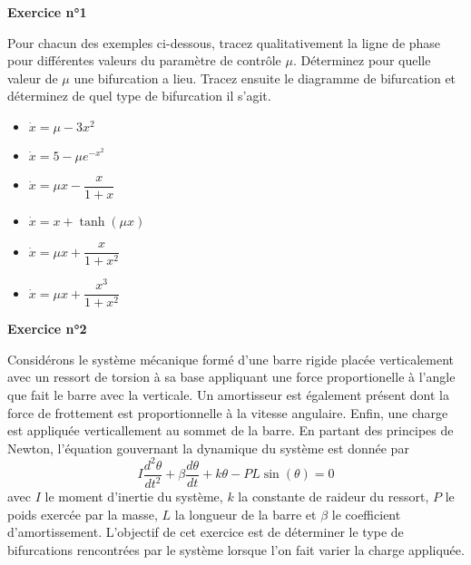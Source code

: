 \documentclass[12pt]{exam}
\begin{document}
\begin{questions}

  \question[10] \textbf{Exercice n°1}
  \noaddpoints

  Pour chacun des exemples ci-dessous, tracez qualitativement la ligne de phase pour différentes valeurs du paramètre de contrôle $\mu$.
  Déterminez pour quelle valeur de $\mu$ une bifurcation a lieu.
  Tracez ensuite le diagramme de bifurcation et déterminez de quel type de bifurcation il s'agit.

  \begin{multicols}{3}
    \begin{itemize}
    \item $\dot{x} = \mu - 3x^2$
    \item $\dot{x} = 5 - \mu e^{-x^2}$
    \item $\dot{x} = \mu x - \dfrac{x}{1+x}$
    \item $\dot{x} = x + \tanh(\mu x)$
    \item $\dot{x} = \mu x + \dfrac{x}{1+x^2}$
    \item $\dot{x} = \mu x + \dfrac{x^3}{1 + x^2}$
    \end{itemize}
  \end{multicols}

  \addpoints
  \question[10] \textbf{Exercice n°2}
  \noaddpoints

  Considérons le système mécanique formé d'une barre rigide placée verticalement avec un ressort de torsion à sa base appliquant une force proportionelle à l'angle que fait le barre avec la verticale.
  Un amortisseur est également présent dont la force de frottement est proportionnelle à la vitesse angulaire.
  Enfin, une charge est appliquée verticallement au sommet de la barre.
  En partant des principes de Newton, l'équation gouvernant la dynamique du système est donnée par
  \[
  I \dfrac{d^2\theta}{dt^2} + \beta \dfrac{d\theta}{dt} + k \theta - PL \sin(\theta) = 0
  \]
  avec $I$ le moment d'inertie du système, $k$ la constante de raideur du ressort, $P$ le poids exercée par la masse, $L$ la longueur de la barre et $\beta$ le coefficient d'amortissement.
  L'objectif de cet exercice est de déterminer le type de bifurcations rencontrées par le système lorsque l'on fait varier la charge appliquée.

\end{questions}
\end{document}
